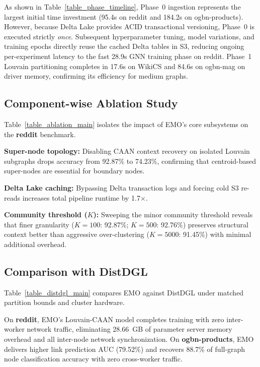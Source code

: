 \documentclass[conference,compsoc]{IEEEtran}
\begin{document}


As shown in Table~\ref{table_phase_timeline}, Phase~0 ingestion represents the largest initial time investment (95.4s on reddit and 184.2s on ogbn-products). However, because Delta Lake provides ACID transactional versioning, Phase~0 is executed strictly \emph{once}. Subsequent hyperparameter tuning, model variations, and training epochs directly reuse the cached Delta tables in S3, reducing ongoing per-experiment latency to the fast 28.9s GNN training phase on reddit. Phase~1 Louvain partitioning completes in 17.6s on WikiCS and 84.6s on ogbn-mag on driver memory, confirming its efficiency for medium graphs.

\subsection{Component-wise Ablation Study}
Table~\ref{table_ablation_main} isolates the impact of EMO's core subsystems on the \textbf{reddit} benchmark.



\textbf{Super-node topology:} Disabling CAAN context recovery on isolated Louvain subgraphs drops accuracy from 92.87\% to 74.23\%, confirming that centroid-based super-nodes are essential for boundary nodes.

\textbf{Delta Lake caching:} Bypassing Delta transaction logs and forcing cold S3 re-reads increases total pipeline runtime by 1.7$\times$.

\textbf{Community threshold ($K$):} Sweeping the minor community threshold reveals that finer granularity ($K\!=\!100$: 92.87\%; $K\!=\!500$: 92.76\%) preserves structural context better than aggressive over-clustering ($K\!=\!5000$: 91.45\%) with minimal additional overhead.

\subsection{Comparison with DistDGL}
Table~\ref{table_distdgl_main} compares EMO against DistDGL under matched partition bounds and cluster hardware.



On \textbf{reddit}, EMO's Louvain-CAAN model completes training with zero inter-worker network traffic, eliminating 28.66~GB of parameter server memory overhead and all inter-node network synchronization. On \textbf{ogbn-products}, EMO delivers higher link prediction AUC (79.52\%) and recovers 88.7\% of full-graph node classification accuracy with zero cross-worker traffic.
\end{document}
